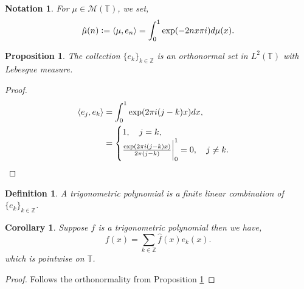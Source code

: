 \documentclass[8pt]{article}
\newtheorem{proposition}{Proposition}[section]
\newtheorem{definition}{Definition}[section]
\newtheorem{notation}{Notation}[section]
\newtheorem{corollary}{Corollary} [section]
\newcommand{\defeq}{\vcentcolon=}
\newcommand{\bZ}[0]{\mathbb{Z}}
\newcommand{\bT}[0]{\mathbb{T}}
\newcommand{\cM}[0]{\mathcal{M}}
\begin{document}
\begin{notation}
  For $\mu\in\cM(\bT)$, we set,
  \begin{equation*}
    \hat{\mu}(n) \defeq \langle \mu,e_n\rangle = \int_0^1 \exp(-2nx\pi i)d\mu(x).
  \end{equation*}
\end{notation}

\begin{proposition}
  \label{proposition_1_2}
  The collection $\{e_k\}_{k\in\bZ}$ is an orthonormal set in $L^2(\bT)$ with Lebesgue measure.
\end{proposition}

\begin{proof}
  \begin{align*}
    \langle e_j,e_k\rangle & = \int_0^1\exp(2\pi i(j-k)x)dx,\\
    & = \begin{cases}
      1,\quad j=k,\\
      {\frac {\exp(2\pi i(j-k)x)} {2\pi(j-k)}}\bigg{|}_0^1 = 0,\quad j\not=k.
    \end{cases}
  \end{align*}
\end{proof}

\begin{definition}
  A trigonometric polynomial is a finite linear combination of $\{e_k\}_{k\in\bZ}$.
\end{definition}

\begin{corollary}
  Suppose $f$ is a trigonometric polynomial then we have,
  \begin{equation*}
    f(x) = \sum_{k\in\bZ}\hat{f}(x)e_k(x).
  \end{equation*}
  which is pointwise on $\bT$.
\end{corollary}

\begin{proof}
  Follows the orthonormality from Proposition \ref{proposition_1_2}
\end{proof}
\end{document}
